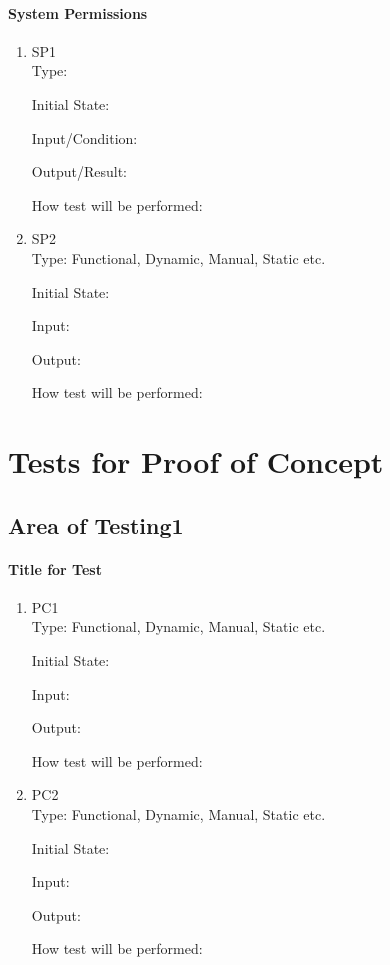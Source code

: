\documentclass[12pt, titlepage]{article}
\begin{document}
	\paragraph{System Permissions}
	\begin{enumerate}
		\item{SP1\\}
		Type: 
		
		Initial State: 
		
		Input/Condition: 
		
		Output/Result: 
		
		How test will be performed: 
		
		\item{SP2\\}
		Type: Functional, Dynamic, Manual, Static etc.
		
		Initial State: 
		
		Input: 
		
		Output: 
		
		How test will be performed: 
	\end{enumerate}

	\section{Tests for Proof of Concept}
	\subsection{Area of Testing1}
	
	\paragraph{Title for Test}
	\begin{enumerate}
		\item{PC1\\}
		Type: Functional, Dynamic, Manual, Static etc.
		
		Initial State: 
		
		Input: 
		
		Output: 
		
		How test will be performed: 
		
		\item{PC2\\}
		Type: Functional, Dynamic, Manual, Static etc.
		
		Initial State: 
		
		Input: 
		
		Output: 
		
		How test will be performed: 
	\end{enumerate}
\end{document}
